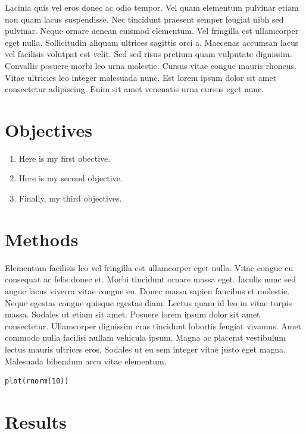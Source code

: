 \documentclass[30pt,extrafontsizes]{memoir}
\begin{document}
\begin{multicols*}{3}
{Lacinia quis vel eros donec ac odio tempor. Vel quam elementum pulvinar
etiam non quam lacus suspendisse. Nec tincidunt praesent semper feugiat
nibh sed pulvinar. Neque ornare aenean euismod elementum. Vel fringilla
est ullamcorper eget nulla. Sollicitudin aliquam ultrices sagittis orci
a. Maecenas accumsan lacus vel facilisis volutpat est velit. Sed sed
risus pretium quam vulputate dignissim. Convallis posuere morbi leo urna
molestie. Cursus vitae congue mauris rhoncus. Vitae ultricies leo
integer malesuada nunc. Est lorem ipsum dolor sit amet consectetur
adipiscing. Enim sit amet venenatis urna cursus eget nunc.

\section{Objectives}\label{objectives}

\large

\begin{enumerate}
\def\labelenumi{\arabic{enumi}.}
\tightlist
\item
  Here is my first obective.
\item
  Here is my second objective.
\item
  Finally, my third objectives.
\end{enumerate}

\small

\section{Methods}\label{methods}

Elementum facilisis leo vel fringilla est ullamcorper eget nulla. Vitae
congue eu consequat ac felis donec et. Morbi tincidunt ornare massa
eget. Iaculis nunc sed augue lacus viverra vitae congue eu. Donec massa
sapien faucibus et molestie. Neque egestas congue quisque egestas diam.
Lectus quam id leo in vitae turpis massa. Sodales ut etiam sit amet.
Posuere lorem ipsum dolor sit amet consectetur. Ullamcorper dignissim
cras tincidunt lobortis feugiat vivamus. Amet commodo nulla facilisi
nullam vehicula ipsum. Magna ac placerat vestibulum lectus mauris
ultrices eros. Sodales ut eu sem integer vitae justo eget magna.
Malesuada bibendum arcu vitae elementum.

\begin{verbatim}
plot(rnorm(10))
\end{verbatim}

\section{Results}\label{results}

}
\end{multicols*}
\end{document}
